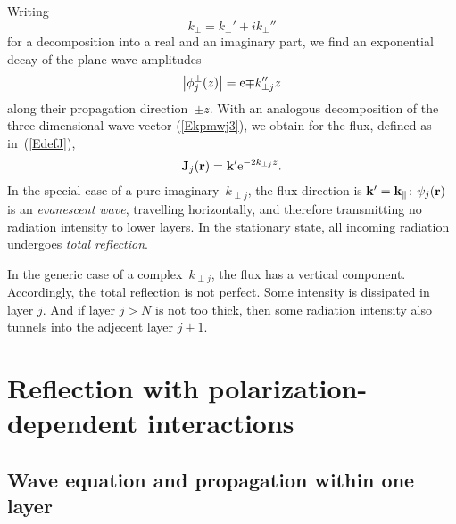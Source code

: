 Writing
\begin{equation}
  k_\perp = k_\perp' + i k_\perp''
\end{equation}
for a decomposition into a real and an imaginary part,
we find an exponential decay of the plane wave amplitudes
\begin{equation}\label{Ephidamp}
  \left|\phi^\pm_j(z)\right|
  = \text{e}{\mp k_{\perp j}'' z}
\end{equation}
along their propagation direction~$\pm z$.
With an analogous decomposition
of the three-dimensional wave vector (\ref{Ekpmwj3}),
we obtain for the flux, defined as in~(\ref{EdefJ}),
\begin{equation}
  \mathbf{J}_j(\mathbf{r}) = \mathbf{k}' \text{e}^{-2k_{\perp j}z}.
\end{equation}
In the special case of a pure imaginary~$k_{\perp j}$,
the flux direction is $\mathbf{k}'=\mathbf{k}_\parallel$:
$\psi_j(\mathbf{r})$ is an \textit{evanescent wave},
%
travelling horizontally,
and therefore transmitting no radiation intensity to lower layers.
In the stationary state,
all incoming radiation undergoes \textit{total reflection}.
%

In the generic case of a complex~$k_{\perp j}$,
the flux has a vertical component.
Accordingly, the total reflection is not perfect.
Some intensity is dissipated in layer $j$.
%
And if layer $j>N$ is not too thick,
then some radiation intensity also tunnels into the adjecent layer $j+1$.
%


\section{Reflection with polarization-dependent interactions}\label{s:pol}



\subsection{Wave equation and propagation within one layer}

